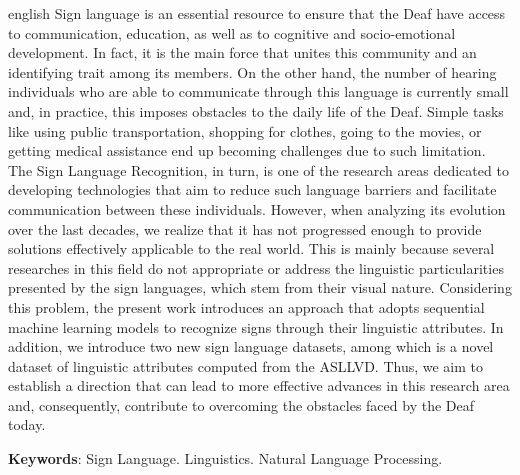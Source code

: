 \begin{resumo}[Abstract]
  \begin{otherlanguage*}{english}
    \noindent
    Sign language is an essential resource to ensure that the Deaf have access to communication, education, as well as to cognitive and socio-emotional development. In fact, it is the main force that unites this community and an identifying trait among its members.
    On the other hand, the number of hearing individuals who are able to communicate through this language is currently small and, in practice, this imposes obstacles to the daily life of the Deaf.
    Simple tasks like using public transportation, shopping for clothes, going to the movies, or getting medical assistance end up becoming challenges due to such limitation.
    The Sign Language Recognition, in turn, is one of the research areas dedicated to developing technologies that aim to reduce such language barriers and facilitate communication between these individuals.
    However, when analyzing its evolution over the last decades, we realize that it has not progressed enough to provide solutions effectively applicable to the real world.
    This is mainly because several researches in this field do not appropriate or address the linguistic particularities presented by the sign languages, which stem from their visual nature.
    Considering this problem, the present work introduces an approach that adopts sequential machine learning models to recognize signs through their linguistic attributes. In addition, we introduce two new sign language datasets, among which is a novel dataset of linguistic attributes computed from the ASLLVD.
    Thus, we aim to establish a direction that can lead to more effective advances in this research area and, consequently, contribute to overcoming the obstacles faced by the Deaf today.

    \vspace{\onelineskip}

    \noindent
    \textbf{Keywords}: Sign Language. Linguistics. Natural Language Processing.
  \end{otherlanguage*}
\end{resumo}
